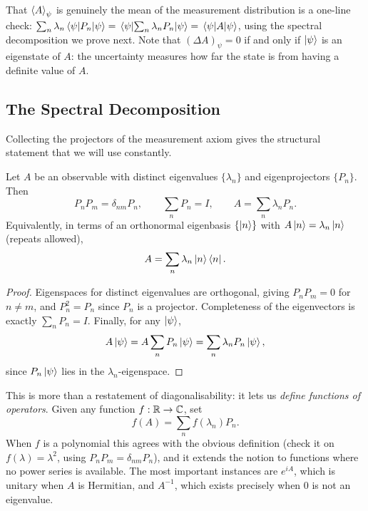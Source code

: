 \documentclass[a4paper]{scrartcl}
\begin{document}
That $\expval{A}_\psi$ is genuinely the mean of the measurement distribution is a one-line check: $\sum_n \lambda_n \mel{\psi}{P_n}{\psi} = \mel{\psi}{\sum_n \lambda_n P_n}{\psi} = \mel{\psi}{A}{\psi}$, using the spectral decomposition we prove next. Note that $(\Delta A)_\psi = 0$ if and only if $\ket{\psi}$ is an eigenstate of $A$: the uncertainty measures how far the state is from having a definite value of $A$.

\subsection{The Spectral Decomposition}

Collecting the projectors of the measurement axiom gives the structural statement that we will use constantly.

\begin{theorem}
    Let $A$ be an observable with distinct eigenvalues $\{\lambda_n\}$ and eigenprojectors $\{P_n\}$. Then
    $$
    P_n P_m = \delta_{nm} P_n, \qquad \sum_n P_n = I, \qquad A = \sum_n \lambda_n P_n.
    $$
    Equivalently, in terms of an orthonormal eigenbasis $\{\ket{n}\}$ with $A\ket{n} = \lambda_n \ket{n}$ (repeats allowed),
    $$
    A = \sum_n \lambda_n \ket{n}\bra{n}.
    $$
\end{theorem}
\begin{proof}
    Eigenspaces for distinct eigenvalues are orthogonal, giving $P_nP_m = 0$ for $n \neq m$, and $P_n^2 = P_n$ since $P_n$ is a projector. Completeness of the eigenvectors is exactly $\sum_n P_n = I$. Finally, for any $\ket{\psi}$,
    $$
    A\ket{\psi} = A \sum_n P_n \ket{\psi} = \sum_n \lambda_n P_n \ket{\psi},
    $$
    since $P_n\ket{\psi}$ lies in the $\lambda_n$-eigenspace. \qedhere
\end{proof}

This is more than a restatement of diagonalisability: it lets us \emph{define functions of operators}. Given any function $f : \mathbb{R} \to \mathbb{C}$, set
$$
f(A) = \sum_n f(\lambda_n) P_n.
$$
When $f$ is a polynomial this agrees with the obvious definition (check it on $f(\lambda) = \lambda^2$, using $P_nP_m = \delta_{nm}P_n$), and it extends the notion to functions where no power series is available. The most important instances are $e^{iA}$, which is unitary when $A$ is Hermitian, and $A^{-1}$, which exists precisely when $0$ is not an eigenvalue.
\end{document}
